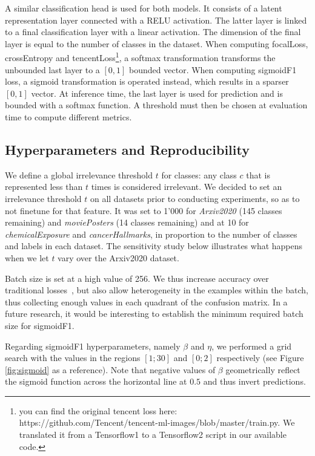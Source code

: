 A similar classification head is used for both models. It consists of a latent representation layer connected with a RELU activation. The latter layer is linked to a final classification layer with a linear activation. The dimension of the final layer is equal to the number of classes in the dataset. When computing focalLoss, crossEntropy and tencentLoss\footnote{you can find the original tencent loss here: https://github.com/Tencent/tencent-ml-images/blob/master/train.py. We translated it from a Tensorflow1 to a Tensorflow2 script in our available code.}, a softmax transformation transforms the unbounded last layer to a $[0,1]$ bounded vector. When computing sigmoidF1 loss, a sigmoid transformation is operated instead, which results in a sparser $[0,1]$ vector. At inference time, the last layer is used for prediction and is bounded with a softmax function. A threshold must then be chosen at evaluation time to compute different metrics.

\subsection{Hyperparameters and Reproducibility}

We define a global irrelevance threshold $t$ for classes: any class $c$ that is represented less than $t$ times is considered irrelevant. We decided to set an irrelevance threshold $t$ on all datasets prior to conducting experiments, so as to not finetune for that feature. It was set to 1'000 for \emph{Arxiv2020} (145 classes remaining) and \emph{moviePosters} (14 classes remaining) and at 10 for \emph{chemicalExposure} and \emph{cancerHallmarks}, in proportion to the number of classes and labels in each dataset. The sensitivity study below illustrates what happens when we let $t$ vary over the Arxiv2020 dataset.

Batch size is set at a high value of 256. We thus increase accuracy over traditional losses~\cite{bigBS}, but also allow heterogeneity in the examples within the batch, thus collecting enough values in  each quadrant of the confusion matrix. In a future research, it would be interesting to establish the minimum required batch size for sigmoidF1.

Regarding sigmoidF1 hyperparameters, namely $\beta$ and $\eta$, we performed a grid search with the values in the regions $[1;30]$ and $[0;2]$ respectively (see Figure \ref{fig:sigmoid} as a reference). Note that negative values of $\beta$ geometrically reflect the sigmoid function across the horizontal line at $0.5$ and thus invert predictions.

